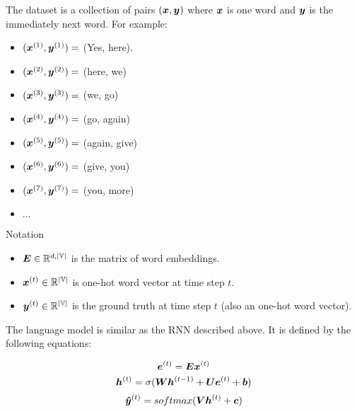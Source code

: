 The dataset is a collection of pairs $(\bm{x},\bm{y})$ where $\bm{x}$ is one word and $\bm{y}$ is the immediately next word. For example:
\begin{itemize}
\item [] $(\bm{x}^{(1)}, \bm{y}^{(1)}) =$ (Yes, here).
\item [] $(\bm{x}^{(2)}, \bm{y}^{(2)}) =$ (here, we)
\item [] $(\bm{x}^{(3)}, \bm{y}^{(3)}) =$ (we, go)
\item [] $(\bm{x}^{(4)}, \bm{y}^{(4)}) =$ (go, again)
\item [] $(\bm{x}^{(5)}, \bm{y}^{(5)}) =$ (again, give)
\item [] $(\bm{x}^{(6)}, \bm{y}^{(6)}) =$ (give, you)
\item [] $(\bm{x}^{(7)}, \bm{y}^{(7)}) =$ (you, more)
\item [] $\dots$
\end{itemize}

Notation

\begin{itemize}
\item $\bm{E} \in \mathbb{R}^{d,|\mathbb{V}|}$ is the matrix of word embeddings.
\vspace{0.3cm}
\item $\bm{x}^{(t)} \in \mathbb{R}^{|\mathbb{V}|}$ is one-hot word vector at time step $t$.
\vspace{0.3cm}
\item $\bm{y}^{(t)} \in \mathbb{R}^{|\mathbb{V}|}$ is the ground truth at time step $t$ (also an one-hot word vector).
\end{itemize}

The language model is similar as the RNN described above. It is defined by the following equations:

\begin{equation}
\bm{e}^{(t)} = \bm{E}\bm{x}^{(t)}
\end{equation}
\vspace{0.2cm}
 \begin{equation}
\bm{h}^{(t)} = \sigma(\bm{W}\bm{h}^{(t-1)}+ \bm{U}\bm{e}^{(t)}+ \bm{b})
\end{equation}
\vspace{0.2cm}
\begin{equation}
\bm{\hat{y}}^{(t)} = softmax(\bm{V}\bm{h}^{(t)} + \bm{c})
\end{equation}



